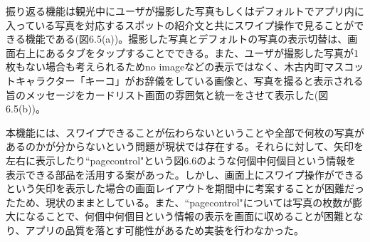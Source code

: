 振り返る機能は観光中にユーザが撮影した写真もしくはデフォルトでアプリ内に入っている写真を対応するスポットの紹介文と共にスワイプ操作で見ることができる機能である(図6.5(a))。撮影した写真とデフォルトの写真の表示切替は、画面右上にあるタブをタップすることでできる。また、ユーザが撮影した写真が1枚もない場合も考えられるためno imageなどの表示ではなく、木古内町マスコットキャラクター「キーコ」がお辞儀をしている画像と、写真を撮ると表示される旨のメッセージをカードリスト画面の雰囲気と統一をさせて表示した(図6.5(b))。\par
本機能には、スワイプできることが伝わらないということや全部で何枚の写真があるのかが分からないという問題が現状では存在する。それらに対して、矢印を左右に表示したり``pagecontrol"という図6.6のような何個中何個目という情報を表示できる部品を活用する案があった。しかし、画面上にスワイプ操作ができるという矢印を表示した場合の画面レイアウトを期間中に考案することが困難だったため、現状のままとしている。また、``pagecontrol"については写真の枚数が膨大になることで、何個中何個目という情報の表示を画面に収めることが困難となり、アプリの品質を落とす可能性があるため実装を行わなかった。

\newpage

